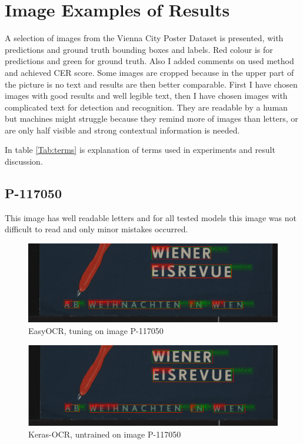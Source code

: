 \section*{Image Examples of Results}

A selection of images from the Vienna City Poster Dataset is presented, with predictions and ground truth bounding boxes and labels. Red colour is for predictions and green for ground truth. Also I added comments on used method and achieved CER score. Some images are cropped because in the upper part of the picture is no text and results are then better comparable. First I have chosen images with good results and well legible text, then I have chosen images with complicated text for detection and recognition. They are readable by a human but machines might struggle because they remind more of images than letters, or are only half visible and strong contextual information is needed. 

In table \ref{Tab:terms} is explanation of terms used in experiments and result discussion.

\subsection*{P-117050}
This image has well readable letters and for all tested models this image was not difficult to read and only minor mistakes occurred.

\begin{figure}[hbtp!]
    \centering
    \includegraphics[scale=0.36]{obrazky/plakaty/result_easyOCR_vienna1_split_tuning_special_sensitive-21.png}
    \caption{EasyOCR, tuning on image P-117050}
    \label{Im2:ex:easy}
\end{figure}

\begin{figure}[hbtp!]
    \centering
    \includegraphics[scale=0.36]{obrazky/plakaty/result_kerasOCR_vienna1_nosplit_nocorrection-21.png}
    \caption{Keras-OCR, untrained on image P-117050}
    \label{Im2:ex:keras}
\end{figure}

